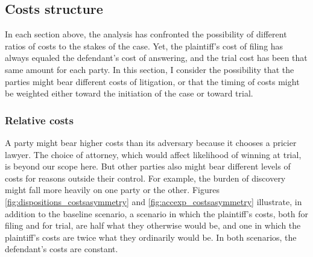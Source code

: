 \documentclass{article}
\begin{document}
\subsection{Costs structure}

In each section above, the analysis has confronted the possibility of different ratios of costs to the stakes of the case. Yet, the plaintiff's cost of filing has always equaled the defendant's cost of answering, and the trial cost has been that same amount for each party. In this section, I consider the possibility that the parties might bear different costs of litigation, or that the timing of costs might be weighted either toward the initiation of the case or toward trial.

\subsubsection{Relative costs}

A party might bear higher costs than its adversary because it chooses a pricier lawyer. The choice of attorney, which would affect likelihood of winning at trial, is beyond our scope here. But other parties also might bear different levels of costs for reasons outside their control. For example, the burden of discovery might fall more heavily on one party or the other. Figures \ref{fig:dispositions_costsasymmetry} and \ref{fig:accexp_costsasymmetry} illustrate, in addition to the baseline scenario, a scenario in which the plaintiff's costs, both for filing and for trial, are half what they otherwise would be, and one in which the plaintiff's costs are twice what they ordinarily would be. In both scenarios, the defendant's costs are constant. 
\end{document}
